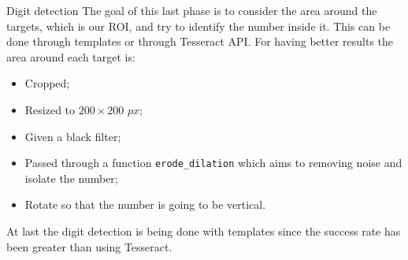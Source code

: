 \begin{frame}[fragile]{Digit detection}
The goal of this last phase is to consider the area around the targets, which is our ROI, and try to identify the number inside it. \newline
This can be done through templates or through Tesseract API. 
For having better results the area around each target is:
\begin{itemize}
	\item Cropped;
	\item Resized to $200\times 200$ $px$;
	\item Given a black filter;
	\item Passed through a function \texttt{erode_dilation} which aims to removing noise and isolate the number;
	\item Rotate so that the number is going to be vertical.
\end{itemize}
At last the digit detection is being done with templates since the success rate has been greater than using Tesseract. 
\end{frame}



